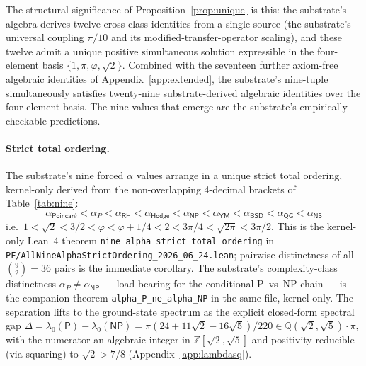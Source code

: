 \documentclass[11pt,a4paper]{amsart}
\theoremstyle{plain}
\theoremstyle{definition}
\begin{document}
The structural significance of Proposition~\ref{prop:unique} is this: the substrate's algebra derives twelve cross-class identities from a single source (the substrate's universal coupling $\pi/10$ and its modified-transfer-operator scaling), and these twelve admit a unique positive simultaneous solution expressible in the four-element basis $\{1, \pi, \varphi, \sqrt{2}\}$. Combined with the seventeen further axiom-free algebraic identities of Appendix~\ref{app:extended}, the substrate's nine-tuple simultaneously satisfies twenty-nine substrate-derived algebraic identities over the four-element basis. The nine values that emerge are the substrate's empirically-checkable predictions.

\paragraph{Strict total ordering.} The substrate's nine forced $\alpha$ values arrange in a unique strict total ordering, kernel-only derived from the non-overlapping 4-decimal brackets of Table~\ref{tab:nine}:
\[
\alpha_{\textsf{Poincar\'e}} < \alpha_P < \alpha_{\textsf{RH}} < \alpha_{\textsf{Hodge}} < \alpha_{\textsf{NP}} < \alpha_{\textsf{YM}} < \alpha_{\textsf{BSD}} < \alpha_{\textsf{QG}} < \alpha_{\textsf{NS}}
\]
i.e.\ $1 < \sqrt{2} < 3/2 < \varphi < \varphi + 1/4 < 2 < 3\pi/4 < \sqrt{2\pi} < 3\pi/2$. This is the kernel-only Lean~4 theorem \texttt{nine\_alpha\_strict\_total\_ordering} in \texttt{PF/AllNineAlphaStrictOrdering\_2026\_06\_24.lean}; pairwise distinctness of all $\binom{9}{2} = 36$ pairs is the immediate corollary. The substrate's complexity-class distinctness $\alpha_P \neq \alpha_{\textsf{NP}}$ --- load-bearing for the conditional P~vs~NP chain --- is the companion theorem \texttt{alpha\_P\_ne\_alpha\_NP} in the same file, kernel-only. The separation lifts to the ground-state spectrum as the explicit closed-form spectral gap $\Delta = \lambda_0(\textsf{P}) - \lambda_0(\textsf{NP}) = \pi(24 + 11\sqrt{2} - 16\sqrt{5})/220 \in \mathbb{Q}(\sqrt{2}, \sqrt{5})\cdot\pi$, with the numerator an algebraic integer in $\mathbb{Z}[\sqrt{2}, \sqrt{5}]$ and positivity reducible (via squaring) to $\sqrt{2} > 7/8$ (Appendix~\ref{app:lambdasq}).
\end{document}
